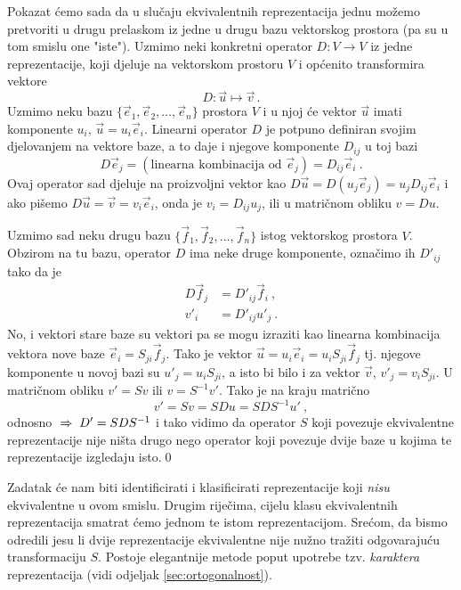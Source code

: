 Pokazat ćemo sada da u slučaju ekvivalentnih reprezentacija jednu
možemo pretvoriti u drugu prelaskom iz jedne u drugu bazu vektorskog
prostora (pa su u tom smislu one "iste"). Uzmimo neki konkretni operator
$D:V \to V$ iz jedne reprezentacije, koji djeluje na vektorskom prostoru
$V$ i općenito transformira vektore
\begin{equation}
D:\vec{u}\mapsto \vec{v} \,.
\end{equation}
Uzmimo neku bazu $\{\vec{e}_1, \vec{e}_2, \ldots, \vec{e}_n\}$ prostora
$V$ i u njoj će vektor $\vec{u}$ imati komponente $u_i$, 
$\vec{u} =  u_i \vec{e}_i$.
Linearni operator $D$ je potpuno definiran svojim djelovanjem na
vektore baze, a to daje i njegove komponente $D_{ij}$ u toj bazi
\begin{equation}
D \vec{e}_j = (\textrm{linearna kombinacija od } \vec{e}_j) = D_{ij}
  \vec{e}_i \:.
\end{equation}
Ovaj operator sad djeluje na proizvoljni vektor kao
  $D\vec{u}=D( u_j \vec{e}_j)= u_j D_{ij} \vec{e}_i$ 
i ako pišemo $D\vec{u}=\vec{v}=v_i \vec{e}_i$, onda je
$v_i = D_{ij} u_j$, ili u matričnom obliku $v=Du$.

Uzmimo sad neku drugu bazu $\{\vec{f}_1, \vec{f}_2, \ldots, \vec{f}_n\}$
istog vektorskog prostora $V$.
Obzirom na tu bazu, operator $D$ ima neke druge komponente, označimo ih
$D'_{ij}$ tako da je
\begin{align}
    D \vec{f}_j& = D'_{ij} \vec{f}_i  \:, \\
    v'_i& = D'_{ij} u'_j \:.
\end{align}
No, i vektori stare baze su vektori pa se mogu izraziti kao linearna
kombinacija vektora nove baze $\vec{e}_i = S_{ji} \vec{f}_j$.
Tako je vektor $\vec{u}=u_i \vec{e}_i = u_i S_{ji} \vec{f}_j$ tj.
njegove komponente u novoj bazi su
$u'_j = u_i S_{ji}$, a isto bi bilo i za vektor $\vec{v}$,  $v'_j = v_i S_{ji}$.
U matričnom obliku $v'=Sv$ ili  $v=S^{-1}v'$.
Tako je na kraju matrično
\begin{equation}
v'=Sv=SDu=SDS^{-1}u' \:,
\end{equation}
odnosno $\;\Rightarrow\; D'=SDS^{-1}$ i tako vidimo da operator $S$ koji povezuje
ekvivalentne reprezentacije nije ništa drugo nego operator koji povezuje
dvije baze u kojima te reprezentacije izgledaju isto.\qed

Zadatak će nam biti identificirati i klasificirati reprezentacije koji
\emph{nisu} ekvivalentne u ovom smislu. Drugim riječima, cijelu klasu
ekvivalentnih reprezentacija smatrat ćemo jednom te istom reprezentacijom.
Srećom, da bismo odredili jesu li dvije reprezentacije ekvivalentne
nije nužno tražiti odgovarajuću transformaciju $S$. Postoje elegantnije metode
poput upotrebe tzv. \emph{karaktera} reprezentacija
(vidi odjeljak \ref{sec:ortogonalnost}).

